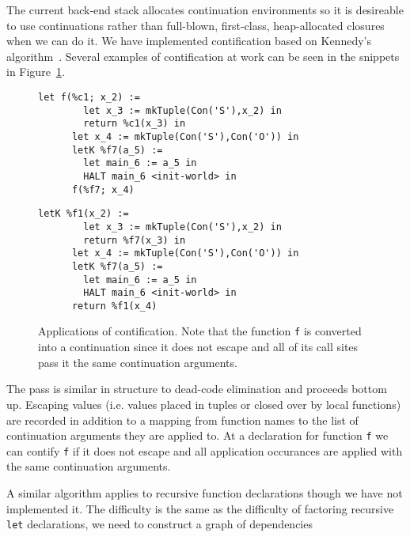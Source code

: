 \documentclass{article}
\begin{document}
The current back-end stack allocates continuation environments so it is desireable to use continuations rather than full-blown, first-class, heap-allocated closures when we can do it. We have implemented contification based on Kennedy's algorithm~\cite{kennedy07cps}. Several examples of contification at work can be seen in the snippets in Figure~\ref{fig:contification}.
\begin{figure}

   \begin{lstlisting}[gobble=6,caption={Before contification}]
      let f(%c1; x_2) := 
        let x_3 := mkTuple(Con('S'),x_2) in
        return %c1(x_3) in
      let x_4 := mkTuple(Con('S'),Con('O')) in
      letK %f7(a_5) := 
        let main_6 := a_5 in
        HALT main_6 <init-world> in
      f(%f7; x_4)
    \end{lstlisting}
    \begin{lstlisting}[gobble=6,caption={After contification}]
      letK %f1(x_2) := 
        let x_3 := mkTuple(Con('S'),x_2) in
        return %f7(x_3) in
      let x_4 := mkTuple(Con('S'),Con('O')) in
      letK %f7(a_5) := 
        let main_6 := a_5 in
        HALT main_6 <init-world> in
      return %f1(x_4)
    \end{lstlisting}

\caption{Applications of contification. Note that the function \lstinline!f! is converted into a continuation since it does not escape and all of its call sites pass it the same continuation arguments.}
\label{fig:contification}
\end{figure}

The pass is similar in structure to dead-code elimination and proceeds bottom up. Escaping values (i.e. values placed in tuples or closed over by local functions) are recorded in addition to a mapping from function names to the list of continuation arguments they are applied to. At a declaration for function \lstinline!f! we can contify \lstinline!f! if it does not escape and all application occurances are applied with the same continuation arguments. 

A similar algorithm applies to recursive function declarations though we have not implemented it. The difficulty is the same as the difficulty of factoring recursive \lstinline!let! declarations, we need to construct a graph of dependencies 


\end{document}
